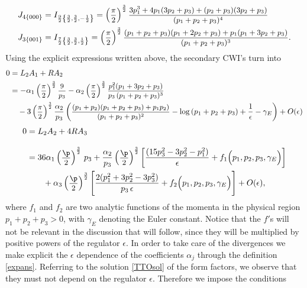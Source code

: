 \documentclass[a4paper,11pt,openright,twoside]{book}
\let\a=\alpha   \let\b=\beta   \let\g=\gamma   \let\d=\delta
\let\e=\epsilon \let\z=\zeta   \let\h=\eta     \let\q=\theta
\newcommand{\sdfrac}[2]{\mbox{\small$\displaystyle\frac{#1}{#2}$}}
\numberwithin{equation}{section}
\begin{document}
{{{\begin{align}
	J_{4\{000\}}&=I_{\frac{9}{2}\left\{\frac{3}{2},\frac{3}{2},-\frac{1}{2}\right\}}=\left(\sdfrac{\pi}{2}\right)^\frac{3}{2}\sdfrac{3p_1^3+4p_1(3p_2+p_3)+(p_2+p_3)(3p_2+p_3)}{(p_1+p_2+p_3)^4}\label{J4000}\\
	J_{3\{001\}}&=I_{\frac{7}{2}\left\{\frac{3}{2},\frac{3}{2},\frac{1}{2}\right\}}=\left(\sdfrac{\pi}{2}\right)^\frac{3}{2}\sdfrac{(p_1+p_2+p_3)(p_1+2p_2+p_3)+p_1(p_1+3p_2+p_3)}{(p_1+p_2+p_3)^3}\label{J3001}.
\end{align}
Using the explicit expressions written above, the secondary CWI's turn into 
\begin{align}
	0&=L_2A_1+RA_2\notag\\
	&=-\a_1\left(\sdfrac{\pi}{2}\right)^\frac{3}{2}\sdfrac{9}{p_3}-\a_2\left(\sdfrac{\pi}{2}\right)^\frac{3}{2}\sdfrac{p_1^2(p_1+3p_2+p_3)}{p_3\,(p_1+p_2+p_3)^3}\notag\\
	&\quad-3\left(\sdfrac{\pi}{2}\right)^\frac{3}{2}\frac{\a_2}{p_3}\left(\sdfrac{(p_1+p_2)(p_1+p_2+p_3)+p_1p_2)}{(p_1+p_2+p_3)^2}-\log\left(p_1+p_2+p_3\right)+\frac{1}{\e}-\gamma_E\right)+O(\e)\label{F7}
\end{align}
\begin{align}
	0&=L_2A_2+4RA_3\notag\\[2ex]
	&=36\a_1\left(\sdfrac{\p}{2}\right)^\frac{3}{2}\,p_3+\frac{\alpha_2}{p_3}\left(\sdfrac{\p}{2}\right)^\frac{3}{2}\bigg[\frac{(15p_3^2-3p_2^2-p_1^2)}{\e}+f_1\Big(p_1,p_2,p_3,\g_E\Big)\bigg]\notag\\
	&\qquad+\alpha_3\left(\sdfrac{\p}{2}\right)^\frac{3}{2}\Bigg[\frac{2(p_1^2+3p_2^2-3p_3^2)}{p_3\,\e}+f_2\Big(p_1,p_2,p_3,\g_E\Big)\Bigg]+O(\e)\label{F8},
\end{align}
where $f_1$ and $f_2$ are two analytic functions of the momenta in the physical region $p_1+p_2+p_3>0$, with $\gamma_E$ denoting the Euler constant. Notice that  
the $f'$s will not be relevant in the discussion that will follow, since they will be multiplied by positive powers of the regulator $\epsilon$.
In order to take care of the divergences we make explicit the $\e$ dependence of the coefficients $\alpha_j$ through the definition \eqref{expans}. Referring to the solution \eqref{TTOsol} of the form factors, we observe that they must not depend on the regulator $\e$. Therefore we impose the conditions \cite{Bzowski:2013sza}

}}}
\end{document}
